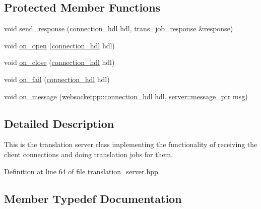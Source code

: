 \subsection*{Protected Member Functions}
\begin{DoxyCompactItemize}
\item 
void \hyperlink{classuva_1_1smt_1_1bpbd_1_1server_1_1translation__server_a57a29ff74e1ed45b04ad70eca4cb81dd}{send\+\_\+response} (\hyperlink{namespacewebsocketpp_a6b3d26a10ee7229b84b776786332631d}{connection\+\_\+hdl} hdl, \hyperlink{classuva_1_1smt_1_1bpbd_1_1common_1_1messaging_1_1trans__job__response}{trans\+\_\+job\+\_\+response} \&response)
\item 
void \hyperlink{classuva_1_1smt_1_1bpbd_1_1server_1_1translation__server_aba474a4a531b53d047d0325c0547090a}{on\+\_\+open} (\hyperlink{namespacewebsocketpp_a6b3d26a10ee7229b84b776786332631d}{connection\+\_\+hdl} hdl)
\item 
void \hyperlink{classuva_1_1smt_1_1bpbd_1_1server_1_1translation__server_ac458534555d855f68799ca675f612bc5}{on\+\_\+close} (\hyperlink{namespacewebsocketpp_a6b3d26a10ee7229b84b776786332631d}{connection\+\_\+hdl} hdl)
\item 
void \hyperlink{classuva_1_1smt_1_1bpbd_1_1server_1_1translation__server_ac26c124f12bc61c9a989e1c899b010ca}{on\+\_\+fail} (\hyperlink{namespacewebsocketpp_a6b3d26a10ee7229b84b776786332631d}{connection\+\_\+hdl} hdl)
\item 
void \hyperlink{classuva_1_1smt_1_1bpbd_1_1server_1_1translation__server_ac3def6980110c67b945d2483a2734630}{on\+\_\+message} (\hyperlink{namespacewebsocketpp_a6b3d26a10ee7229b84b776786332631d}{websocketpp\+::connection\+\_\+hdl} hdl, \hyperlink{classwebsocketpp_1_1endpoint_a585ecbbfd9689d4e4229e4c8378bd672}{server\+::message\+\_\+ptr} msg)
\end{DoxyCompactItemize}


\subsection{Detailed Description}
This is the translation server class implementing the functionality of receiving the client connections and doing translation jobs for them. 

Definition at line 64 of file translation\+\_\+server.\+hpp.



\subsection{Member Typedef Documentation}
\hypertarget{classuva_1_1smt_1_1bpbd_1_1server_1_1translation__server_a7a3d55d39330bc8414d5c0964c8e5bd7}{}
